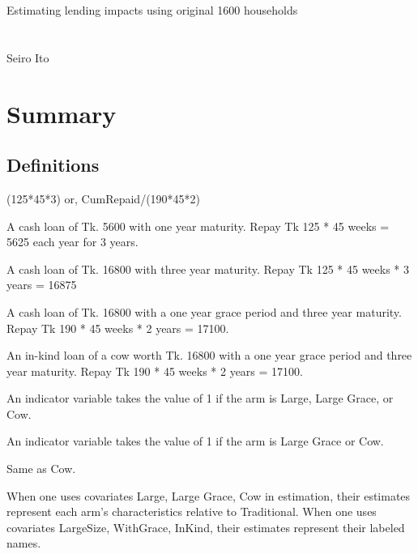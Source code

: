 \setlength{\baselineskip}{12pt}

\citet{Wooldridge2010}







\hfil Estimating lending impacts using original 1600 households\\

\hfil\MonthDY\\
\hfil{\footnotesize\currenttime}\\

\hfil Seiro Ito

\setcounter{tocdepth}{3}
\tableofcontents
\newpage

\setlength{\parindent}{1em}
\vspace{2ex}




\section{Summary}

\subsection{Definitions}

(125*45*3) or, CumRepaid/(190*45*2)
\begin{description}
\vspace{1.0ex}\setlength{\itemsep}{1.0ex}\setlength{\baselineskip}{12pt}
\item[Traditional]	A cash loan of Tk. 5600 with one year maturity. Repay Tk 125 * 45 weeks = 5625 each year for 3 years.
\item[Large]	A cash loan of Tk. 16800 with three year maturity. Repay Tk 125 * 45 weeks * 3 years = 16875
\item[Large Grace]	A cash loan of Tk. 16800 with a one year grace period and three year maturity. Repay Tk 190 * 45 weeks * 2 years = 17100.
\item[Cow]	An in-kind loan of a cow worth Tk. 16800 with a one year grace period and three year maturity. Repay Tk 190 * 45 weeks * 2 years = 17100.
\item[LargeSize]	An indicator variable takes the value of 1 if the arm is Large, Large Grace, or Cow.
\item[WithGrace]	An indicator variable takes the value of 1 if the arm is Large Grace or Cow.
\item[InKind]	Same as Cow.
\end{description}
When one uses covariates \textsf{Large, Large Grace, Cow} in estimation, their estimates represent each arm's characteristics relative to \textsf{Traditional}. When one uses covariates \textsf{LargeSize, WithGrace, InKind}, their estimates represent their labeled names.

